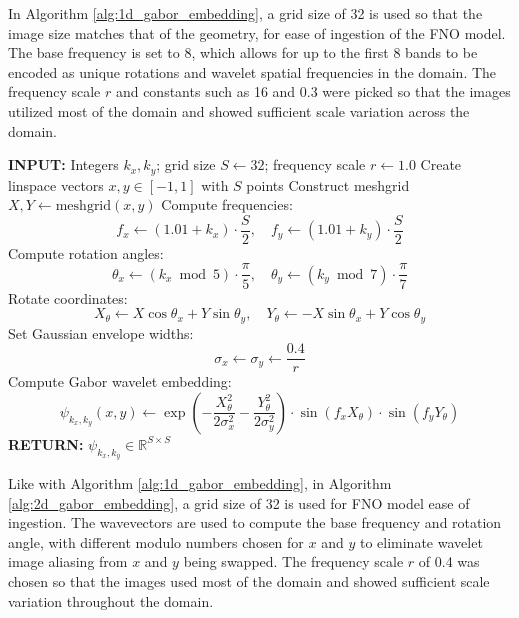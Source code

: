 \documentclass[preprint,review,12pt]{elsarticle}
\begin{document}
In Algorithm \ref{alg:1d_gabor_embedding}, a grid size of 32 is used so that the image size matches that of the geometry, for ease of ingestion of the FNO model. The base frequency is set to 8, which allows for up to the first 8 bands to be encoded as unique rotations and wavelet spatial frequencies in the domain. The frequency scale $r$ and constants such as 16 and 0.3 were picked so that the images utilized most of the domain and showed sufficient scale variation across the domain.

\begin{algorithm}[H]
\caption{2D Gabor Wavelet Embedding for Wavevectors}
\label{alg:2d_gabor_embedding}
\begin{algorithmic}[1]
\STATE \textbf{INPUT:} Integers \( k_x, k_y \); grid size \( S \leftarrow 32 \); frequency scale \( r \leftarrow 1.0 \)
\STATE Create linspace vectors \( x, y \in [-1, 1] \) with \( S \) points
\STATE Construct meshgrid \( X, Y \leftarrow \text{meshgrid}(x, y) \)
\STATE Compute frequencies:
\[
f_x \leftarrow (1.01 + k_x) \cdot \frac{S}{2}, \quad f_y \leftarrow (1.01 + k_y) \cdot \frac{S}{2}
\]
\STATE Compute rotation angles:
\[
\theta_x \leftarrow (k_x \bmod 5) \cdot \frac{\pi}{5}, \quad \theta_y \leftarrow (k_y \bmod 7) \cdot \frac{\pi}{7}
\]
\STATE Rotate coordinates:
\[
X_\theta \leftarrow X \cos \theta_x + Y \sin \theta_y, \quad
Y_\theta \leftarrow -X \sin \theta_x + Y \cos \theta_y
\]
\STATE Set Gaussian envelope widths:
\[
\sigma_x \leftarrow \sigma_y \leftarrow \frac{0.4}{r}
\]
\STATE Compute Gabor wavelet embedding:
\[
\psi_{k_x, k_y}(x, y) \leftarrow
\exp\left(-\frac{X_\theta^2}{2 \sigma_x^2} - \frac{Y_\theta^2}{2 \sigma_y^2}\right)
\cdot \sin(f_x X_\theta) \cdot \sin(f_y Y_\theta)
\]
\STATE \textbf{RETURN:} \( \psi_{k_x, k_y} \in \mathbb{R}^{S \times S} \)
\end{algorithmic}
\end{algorithm}

Like with Algorithm \ref{alg:1d_gabor_embedding}, in Algorithm \ref{alg:2d_gabor_embedding}, a grid size of 32 is used for FNO model ease of ingestion. The wavevectors are used to compute the base frequency and rotation angle, with different modulo numbers chosen for $x$ and $y$ to eliminate wavelet image aliasing from $x$ and $y$ being swapped. The frequency scale $r$ of 0.4 was chosen so that the images used most of the domain and showed sufficient scale variation throughout the domain.
\end{document}
